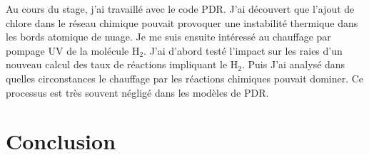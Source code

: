 \documentclass[11pt,a4paper,twoside,openright]{article}
\begin{document}
\begin{spacing}{0.98}
Au cours du stage, j'ai travaillé avec le code PDR. J'ai découvert que l'ajout de chlore dans le réseau chimique pouvait provoquer une instabilité thermique dans les bords atomique de nuage. Je me suis ensuite intéressé au chauffage par pompage UV de la molécule $\mathrm{H}_2$. J'ai d'abord testé l'impact sur les raies d'un nouveau calcul des taux de réactions impliquant le $\mathrm{H}_2$. Puis J'ai analysé dans quelles circonstances le chauffage par les réactions chimiques pouvait dominer. Ce processus est très souvent négligé dans les modèles de PDR. 








\clearpage

\clearpage


\clearpage
\section*{Conclusion}




\clearpage



\clearpage





\end{spacing}
\end{document}
